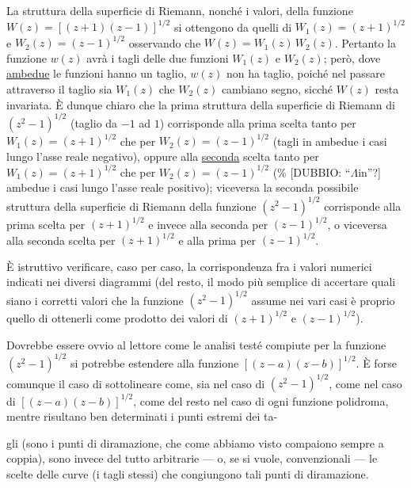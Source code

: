 \documentclass[11pt, a4paper]{book}
\numberwithin{equation}{section}
\begin{document}
La struttura della superficie di Riemann, nonché i valori, della funzione
$W(z) = \left[(z+1)(z-1)\right]^{1/2}$ si ottengono da quelli di $W_1(z)=(z+1)^{1/2}$
e $W_2(z)=(z-1)^{1/2}$ osservando che $W(z) = W_1(z)\,W_2(z)$. Pertanto la
funzione $w(z)$ avrà i tagli delle due funzioni $W_1(z)$ e $W_2(z)$; però,
dove \underline{ambedue} le funzioni hanno un taglio, $w(z)$ non ha taglio, poiché
nel passare attraverso il taglio sia $W_1(z)$ che $W_2(z)$ cambiano segno, sicché
$W(z)$ resta invariata. È dunque chiaro che la prima struttura della superficie
di Riemann di $(z^2-1)^{1/2}$ (taglio da $-1$ ad $1$) corrisponde alla prima
scelta tanto per $W_1(z) = (z+1)^{1/2}$ che per $W_2(z) = (z-1)^{1/2}$
(tagli in ambedue i casi lungo l'asse reale negativo), oppure alla
\underline{seconda} scelta tanto per $W_1(z) = (z+1)^{1/2}$ che per
$W_2(z) = (z-1)^{1/2}$ (\% [DUBBIO: ``$\Lambda$in''?] ambedue i casi lungo
l'asse reale positivo); viceversa la seconda possibile struttura della superficie
di Riemann della funzione $(z^2-1)^{1/2}$ corrisponde alla prima scelta per
$(z+1)^{1/2}$ e invece alla seconda per $(z-1)^{1/2}$, o viceversa alla seconda
scelta per $(z+1)^{1/2}$ e alla prima per $(z-1)^{1/2}$.

È istruttivo verificare, caso per caso, la corrispondenza fra i valori
numerici indicati nei diversi diagrammi (del resto, il modo più semplice di
accertare quali siano i corretti valori che la funzione $(z^2-1)^{1/2}$ assume
nei vari casi è proprio quello di ottenerli come prodotto dei valori di
$(z+1)^{1/2}$ e $(z-1)^{1/2}$).

Dovrebbe essere ovvio al lettore come le analisi testé compiute per la
funzione $(z^2-1)^{1/2}$ si potrebbe estendere alla funzione
$\left[(z-a)(z-b)\right]^{1/2}$. È forse comunque il caso di sottolineare come,
sia nel caso di $(z^2-1)^{1/2}$, come nel caso di $\left[(z-a)(z-b)\right]^{1/2}$,
come del resto nel caso di ogni funzione polidroma, mentre risultano ben determinati
i punti estremi dei ta-


gli (sono i punti di diramazione, che come abbiamo visto compaiono sempre
a coppia), sono invece del tutto arbitrarie --- o, se si vuole, convenzionali
--- le scelte delle curve (i tagli stessi) che congiungono tali punti di diramazione.
\end{document}
